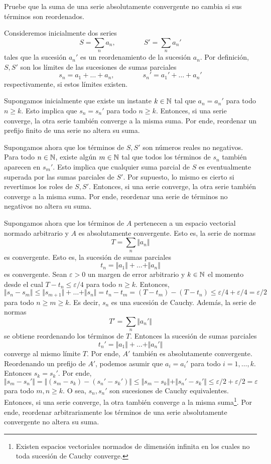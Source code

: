 \begin{exercise}
Pruebe que la suma de una serie absolutamente convergente no cambia si sus términos son reordenados.
\end{exercise}

\begin{solution}
Consideremos inicialmente dos series
$$S = \sum_n a_n, \qquad \qquad S' = \sum_n a_n'$$
tales que la sucesión $a_n'$ es un reordenamiento de la sucesión $a_n$. Por definición, $S, S'$ son los límites de las sucesiones de sumas parciales
$$s_n = a_1 + \dots + a_n, \qquad \qquad s_n' = a_1' + \dots + a_n'$$
respectivamente, si estos límites existen.

Supongamos inicialmente que existe un instante $k \in \mathbb N$ tal que $a_n = a_n'$ para todo $n \ge k$. Esto implica que $s_n = s_n'$ para todo $n \ge k$. Entonces, si una serie converge, la otra serie también converge a la misma suma. Por ende, reordenar un prefijo finito de una serie no altera su suma.

Supongamos ahora que los términos de $S, S'$ son números reales no negativos. Para todo $n \in \mathbb N$, existe algún $m \in \mathbb N$ tal que todos los términos de $s_n$ también aparecen en $s_m'$. Esto implica que cualquier suma parcial de $S$ es eventualmente superada por las sumas parciales de $S'$. Por supuesto, lo mismo es cierto si revertimos los roles de $S, S'$. Entonces, si una serie converge, la otra serie también converge a la misma suma. Por ende, reordenar una serie de términos no negativos no altera su suma.

Supongamos ahora que los términos de $A$ pertenecen a un espacio vectorial normado arbitrario y $A$ es absolutamente convergente. Esto es, la serie de normas
$$T = \sum_n \Vert a_n \Vert$$
es convergente. Esto es, la sucesión de sumas parciales
$$t_n = \Vert a_1 \Vert + \dots + \Vert a_n \Vert$$
es convergente. Sean $\varepsilon > 0$ un margen de error arbitrario y $k \in \mathbb N$ el momento desde el cual $T - t_n \le \varepsilon/4$ para todo $n \ge k$. Entonces,
$$
\Vert s_n - s_m \Vert
    \le \Vert s_{m+1} \Vert + \dots + \Vert s_n \Vert
    = t_n - t_m = (T - t_m) - (T - t_n)
    \le \varepsilon/4 + \varepsilon/4
    = \varepsilon/2
$$
para todo $n \ge m \ge k$. Es decir, $s_n$ es una sucesión de Cauchy. Además, la serie de normas
$$T' = \sum_n \Vert a_n' \Vert$$
se obtiene reordenando los términos de $T$. Entonces la sucesión de sumas parciales
$$t_n' = \Vert a_1 \Vert + \dots + \Vert a_n' \Vert$$
converge al mismo límite $T$. Por ende, $A'$ también es absolutamente convergente. Reordenando un prefijo de $A'$, podemos asumir que $a_i = a_i'$ para todo $i = 1, \dots, k$. Entonces $s_k = s_k'$. Por ende,
$$
\Vert s_m - s_n' \Vert
    = \Vert (s_m - s_k) - (s_n' - s_k') \Vert
    \le \Vert s_m - s_k \Vert + \Vert s_n' - s_k' \Vert
    \le \varepsilon/2 + \varepsilon/2
    = \varepsilon
$$
para todo $m, n \ge k$. O sea, $s_n, s_n'$ son sucesiones de Cauchy equivalentes. Entonces, si una serie converge, la otra también converge a la misma suma\footnote{Existen espacios vectoriales normados de dimensión infinita en los cuales no toda sucesión de Cauchy converge.}. Por ende, reordenar arbitrariamente los términos de una serie absolutamente convergente no altera su suma.
\end{solution}
